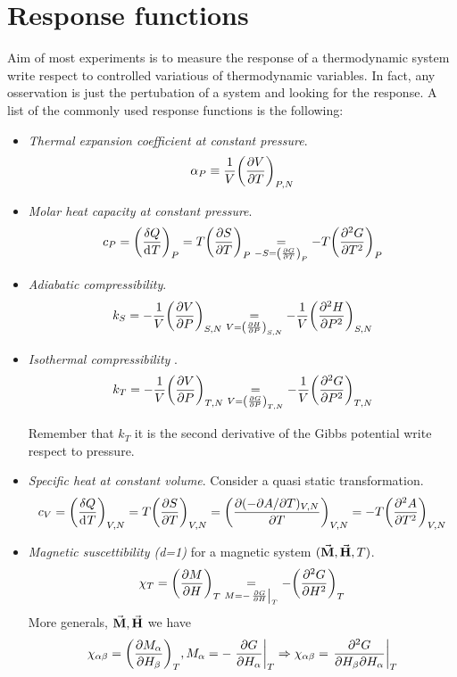 \documentclass[../main/main.tex]{subfiles}
\begin{document}
\section{Response functions}
Aim of most experiments is to measure the response of a thermodynamic system write respect to controlled variatious of thermodynamic variables. In fact, any osservation is just the pertubation of a system and looking for the response.
A list of the commonly used response functions is the following:
\begin{itemize}
\item \emph{Thermal expansion coefficient at constant pressure}.
\begin{equation}
  \alpha _P \equiv \frac{1}{V} \qty(\pdv{V}{T} )_{P,N}
  \label{eq:}
\end{equation}
\item \emph{Molar heat capacity at constant pressure}.
\begin{equation}
  c_P = \qty(\frac{\delta Q}{\dd[]{T} } )_P = T \qty(\pdv{S}{T} )_P \underset{-S=\qty(\pdv{G}{T} )_P }{=}  - T \qty(\pdv[2]{G}{T} )_P
  \label{eq:}
\end{equation}
\item \emph{Adiabatic compressibility}.
\begin{equation}
  k_S = -\frac{1}{V} \qty(\pdv{V}{P} )_{S,N} \underset{V=\qty(\pdv{H}{P} )_{S,N} }{=} - \frac{1}{V} \qty(\pdv[2]{H}{P} )_{S,N}
    \label{eq:}
\end{equation}
\item \emph{Isothermal compressibility} .
\begin{equation}
  k_T = -\frac{1}{V} \qty(\pdv{V}{P} )_{T,N} \underset{V=\qty(\pdv{G}{P} )_{T,N} }{=} - \frac{1}{V} \qty(\pdv[2]{G}{P} )_{T,N}
  \label{eq:}
\end{equation}
\begin{remark}
Remember that \( k_T \) it is the second derivative of the Gibbs potential write respect to pressure.
\end{remark}
\item \emph{Specific heat at constant volume}. Consider a quasi static transformation.
\begin{equation}
  c_V =  \qty(\frac{\delta Q}{\dd[]{T} } )_{V,N} = T \qty(\pdv{S}{T} )_{V,N}
      = \qty( \frac{\partial{(-\partial{A}/\partial{T} )_{V,N}} }{\partial{T} })_{V,N}
      = - T \qty(\pdv[2]{A}{T} )_{V,N}
  \label{eq:}
\end{equation}
\item \emph{Magnetic suscettibility (d=1)} for a magnetic system \( (\va{M},\va{H},T  ) \).
\begin{equation}
  \chi_T = \qty(\pdv{M}{H} )_T \underset{M = -\eval{\pdv{G}{H}}_T }{=}  - \qty(\pdv[2]{G}{H} )_T
  \label{eq:}
\end{equation}
More generals, \( \va{M},\va{H}   \) we have
\begin{equation}
  \chi _{\alpha \beta } = \qty(\pdv{M_ \alpha }{H_ \beta } )_T , M_ \alpha = -\eval{\pdv{G}{H_ \alpha }}_T \Rightarrow \chi _{\alpha \beta } = \eval{\pdv{G}{H_ \beta }{H_ \alpha }}_T
  \label{eq:}
\end{equation}

\end{itemize}
\end{document}
